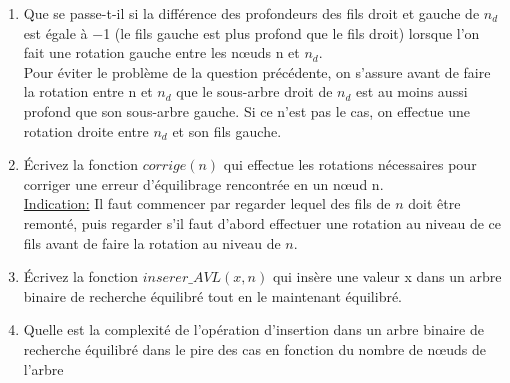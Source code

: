 \documentclass[10pt,a4paper]{article}
\begin{document}
\begin{enumerate}
    \item Que se passe-t-il si la différence des profondeurs des fils droit et gauche de $n_d$ est égale à −1 (le
fils gauche est plus profond que le fils droit) lorsque l’on fait une rotation gauche entre les nœuds n
et $n_d$.\\

Pour éviter le problème de la question précédente, on s’assure avant de faire la rotation entre n et $n_d$
que le sous-arbre droit de $n_d$ est au moins aussi profond que son sous-arbre gauche. Si ce n’est pas le
cas, on effectue une rotation droite entre $n_d$ et son fils gauche.

    \item  Écrivez la fonction $corrige(n)$ qui effectue les rotations nécessaires pour corriger une erreur
d’équilibrage rencontrée en un nœud n.\\

\underline{Indication:} Il faut commencer par regarder lequel des fils de $n$ doit être remonté, puis regarder s’il
faut d’abord effectuer une rotation au niveau de ce fils avant de faire la rotation au niveau de $n$.\\

    \item Écrivez la fonction $inserer\_AVL(x, n)$ qui insère une valeur x dans un arbre binaire de recherche équilibré tout en le maintenant équilibré.
    
    \item Quelle est la complexité de l’opération d’insertion dans un arbre binaire de recherche équilibré
dans le pire des cas en fonction du nombre de nœuds de l’arbre


\end{enumerate}
\end{document}
